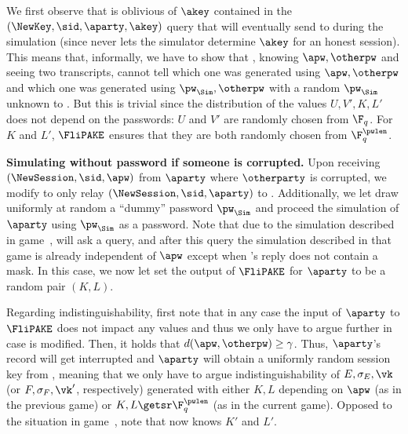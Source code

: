 \begin{games}
We first observe that \Env is oblivious of $\akey$ contained in the $(\NewKey,\sid,\aparty,\akey)$ query that \Sim will eventually send to \Func during the simulation (since \Func never lets the simulator determine $\akey$ for an honest session). This means that, informally, we have to show that \Env, knowing $\apw,\otherpw$ and seeing two transcripts, cannot tell which one  was generated using $\apw,\otherpw$ and which one was generated using  $\pw_\Sim,\otherpw$ with a random $\pw_\Sim$ unknown to \Env. But this is trivial since the distribution of the values $U,V',K,L'$ does not depend on the passwords: $U$ and $V'$ are randomly chosen from $\F_q$. For $K$ and $L'$, $\FliPAKE$ ensures that they are both randomly chosen from $\F_q^\pwlen$. 

\textbf{Simulating without password if someone is corrupted.}
Upon receiving $(\NewSession,\sid,\apw)$ from $\aparty$ where $\otherparty$ is corrupted, we modify \Func to only relay $(\NewSession,\sid,\aparty)$ to \Sim. Additionally, we let \Sim draw uniformly at random a ``dummy'' password $\pw_\Sim$ and proceed the simulation of $\aparty$ using $\pw_\Sim$ as a password. Note that due to the simulation described in game~, \Sim will ask a \TestPwd query, and after this query the simulation described in that game is already independent of $\apw$ except when \Func's reply does not contain a mask. In this case, we now let \Sim set the output of $\FliPAKE$ for $\aparty$ to be a random pair $(K,L)$. 

Regarding indistinguishability, first note that in any case the input of $\aparty$ to $\FliPAKE$ does not impact any values and thus we only have to argue further in case \Sim is modified. Then, it holds that $d(\apw,\otherpw)\geq \gamma$. Thus, $\aparty$'s record will get interrupted and $\aparty$ will obtain a uniformly random session key from \Func, meaning that we only have to argue indistinguishability of $E,\sigma_E,\vk$ (or $F,\sigma_F,\vk'$, respectively) generated with either $K,L$ depending on $\apw$ (as in the previous game) or $K,L\getsr\F_q^\pwlen$ (as in the current game). Opposed to the situation in game~\previousgame, note that now \Env knows $K'$ and $L'$. 


\end{games}
